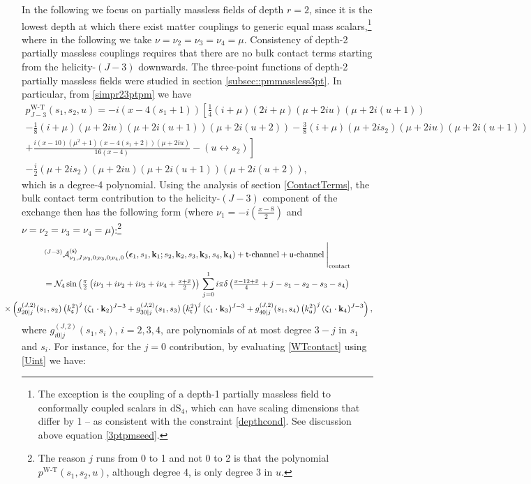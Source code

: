\documentclass[11pt,a4paper]{article}
\begin{document}
In the following we focus on partially massless fields of depth $r=2$, since it is the lowest depth at which there exist matter couplings to generic equal mass scalars,\footnote{The exception is the coupling of a depth-1 partially massless field to conformally coupled scalars in dS$_4$, which can have scaling dimensions that differ by 1 -- as consistent with the constraint \eqref{depthcond}. See discussion above equation \eqref{3ptpmseed}.} where in the following we take $\nu=\nu_2=\nu_3=\nu_4=\mu$. Consistency of depth-2 partially massless couplings requires that there are no bulk contact terms starting from the helicity-$\left(J-3\right)$ downwards. The three-point functions of depth-2 partially massless fields  were studied in section \ref{subsec::pmmassless3pt}. In particular, from \eqref{simpr23ptpm} we have
\begin{multline}
 p^{\text{W-T}}_{J-3}\left(s_1,s_2,u\right)=-i(x-4 (s_1+1))\left[  \tfrac{1}{4} (i+\mu ) (2 i+\mu ) (\mu +2 i u) (\mu +2 i (u+1))\right.\\-\tfrac{1}{8}  \left(i+\mu \right) (\mu +2 i u) (\mu +2 i (u+1)) (\mu +2 i (u+2))-\tfrac{3}{8} (i+\mu ) (\mu +2 i s_2) (\mu +2 i u)(\mu +2 i (u+1))\\\left.+\frac{i(x-10) \left(\mu ^2+1\right)(x-4 (s_1+2)) (\mu +2 i u)}{16 (x-4)}-\left(u \leftrightarrow s_2\right)\right]\\
  -\tfrac{i}{2}(\mu +2 i s_2)  (\mu +2 i u)  (\mu +2 i (u+1))(\mu +2i(u+2)),
\end{multline}
which is a degree-4 polynomial. Using the analysis of section \ref{ContactTerms}, the bulk contact term contribution to the helicity-$\left(J-3\right)$ component of the exchange then has the following form (where $\nu_1 =- i \left(\tfrac{x-8}{2}\right)$ and $\nu=\nu_2=\nu_3=\nu_4=\mu$):\footnote{The reason $j$ runs from 0 to 1 and not 0 to 2 is that the polynomial $p^{\text{W-T}}\left(s_1,s_2,u\right)$, although degree 4, is only degree 3 in $u$.}
\begin{multline}\label{PMcontactquartic}
{}^{\left(J-3\right)}{\cal A}^{\left({\sf s}\right)}_{\nu_1,J;\nu_2,0;\nu_3,0;\nu_4,0}\left(\boldsymbol{\epsilon}_1,s_1,{\bf k}_1;s_2,{\bf k}_2,s_3,{\bf k}_3,s_4,{\bf k}_4\right)+ {\sf t}\text{-channel}+ {\sf u}\text{-channel}\:\Bigg|_{\text{contact}}\\
= {\cal N}_4 \sin \left(\tfrac{\pi}{2} \left( i\nu_1+i\nu_2+i\nu_3+i\nu_4+\tfrac{x+{\bar x}}{2}\right)\right)\,\sum^1\limits_{j=0}i \pi \delta\left(\tfrac{x-12+{\bar x}}{4}+j-s_1-s_2-s_3-s_4\right) \\ \hspace*{-0.75cm} \times \left(g^{\left(J,2\right)}_{20|j}(s_1,s_2)\left(k^2_{\sf s}\right)^{j}(\zeta_1\cdot\bold{k}_2)^{J-3}+g^{\left(J,2\right)}_{30|j}(s_1,s_3)\left(k^2_{\sf t}\right)^{j}(\zeta_1\cdot\bold{k}_3)^{J-3}+g^{\left(J,2\right)}_{40|j}(s_1,s_4)\left(k^2_{\sf u}\right)^{j}(\zeta_1\cdot\bold{k}_4)^{J-3}\right),
\end{multline}
where $g^{\left(J,2\right)}_{i0|j}(s_1,s_i)$, $i=2,3,4$, are polynomials of at most degree $3-j$ in $s_1$ and $s_i$. For instance, for the $j=0$ contribution, by evaluating \eqref{WTcontact} using \eqref{Uint} we have:
\end{document}
